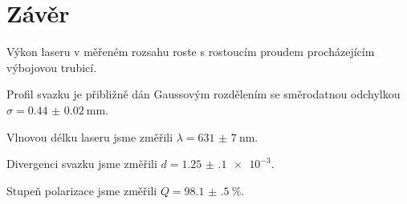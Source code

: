 \section*{Závěr}

Výkon laseru v měřeném rozsahu roste s rostoucím proudem procházejícím výbojovou trubicí.

Profil svazku je přibližně dán Gaussovým rozdělením se směrodatnou odchylkou $\sigma=\SI{0.44(2)}{\mm}$.

Vlnovou délku laseru jsme změřili $\lambda=\SI{631(7)}{\nm}$.

Divergenci svazku jsme změřili $d=\num{1.25(10)e-3}$.

Stupeň polarizace jsme změřili $Q=\SI{98.1(5)}{\percent}$.